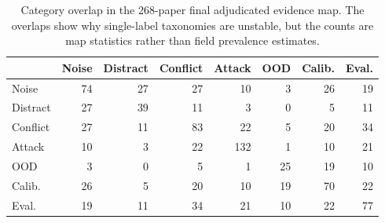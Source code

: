 \begin{table}[t]
\centering
\scriptsize
\begin{tabular}{lrrrrrrr}
\toprule
 & Noise & Distract & Conflict & Attack & OOD & Calib. & Eval. \\ 
\midrule
Noise & 74 & 27 & 27 & 10 & 3 & 26 & 19 \\ 
Distract & 27 & 39 & 11 & 3 & 0 & 5 & 11 \\ 
Conflict & 27 & 11 & 83 & 22 & 5 & 20 & 34 \\ 
Attack & 10 & 3 & 22 & 132 & 1 & 10 & 21 \\ 
OOD & 3 & 0 & 5 & 1 & 25 & 19 & 10 \\ 
Calib. & 26 & 5 & 20 & 10 & 19 & 70 & 22 \\ 
Eval. & 19 & 11 & 34 & 21 & 10 & 22 & 77 \\ 
\bottomrule
\end{tabular}
\caption{Category overlap in the 268-paper final adjudicated evidence map. The overlaps show why single-label taxonomies are unstable, but the counts are map statistics rather than field prevalence estimates.}
\label{tab:category-overlap}
\end{table}
